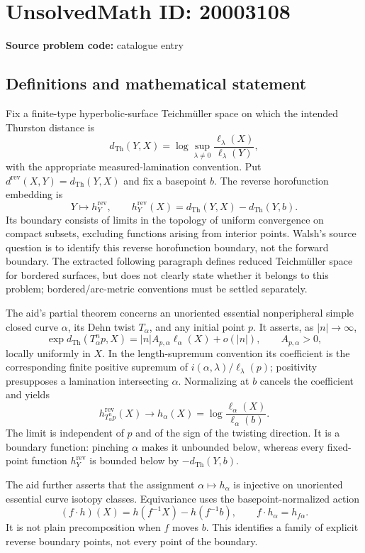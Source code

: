 \documentclass[11pt]{article}
\begin{document}
\section*{UnsolvedMath ID: 20003108}
\textbf{Source problem code:} catalogue entry
\subsection{Definitions and mathematical statement}
Fix a finite-type hyperbolic-surface Teichm\"uller space on which the intended Thurston distance is
\[
d_{\mathrm{Th}}(Y,X)=\log\sup_{\lambda\ne0}\frac{\ell_\lambda(X)}{\ell_\lambda(Y)},
\]
with the appropriate measured-lamination convention. Put $d^{\mathrm{rev}}(X,Y)=d_{\mathrm{Th}}(Y,X)$ and fix a basepoint $b$. The reverse horofunction embedding is
\[
Y\longmapsto h_Y^{\mathrm{rev}},\qquad
h_Y^{\mathrm{rev}}(X)=d_{\mathrm{Th}}(Y,X)-d_{\mathrm{Th}}(Y,b).
\]
Its boundary consists of limits in the topology of uniform convergence on compact subsets, excluding functions arising from interior points. Walsh's source question is to identify this reverse horofunction boundary, not the forward boundary. The extracted following paragraph defines reduced Teichm\"uller space for bordered surfaces, but does not clearly state whether it belongs to this problem; bordered/arc-metric conventions must be settled separately.

The aid's partial theorem concerns an unoriented essential nonperipheral simple closed curve $\alpha$, its Dehn twist $T_\alpha$, and any initial point $p$. It asserts, as $|n|\to\infty$,
\[
\exp d_{\mathrm{Th}}(T_\alpha^n p,X)
=|n|A_{p,\alpha}\ell_\alpha(X)+o(|n|),\qquad A_{p,\alpha}>0,
\]
locally uniformly in $X$. In the length-supremum convention its coefficient is the corresponding finite positive supremum of $i(\alpha,\lambda)/\ell_\lambda(p)$; positivity presupposes a lamination intersecting $\alpha$. Normalizing at $b$ cancels the coefficient and yields
\[
h_{T_\alpha^n p}^{\mathrm{rev}}(X)\longrightarrow
h_\alpha(X)=\log\frac{\ell_\alpha(X)}{\ell_\alpha(b)}.
\]
The limit is independent of $p$ and of the sign of the twisting direction. It is a boundary function: pinching $\alpha$ makes it unbounded below, whereas every fixed-point function $h_Y^{\mathrm{rev}}$ is bounded below by $-d_{\mathrm{Th}}(Y,b)$.

The aid further asserts that the assignment $\alpha\mapsto h_\alpha$ is injective on unoriented essential curve isotopy classes. Equivariance uses the basepoint-normalized action
\[
(f\cdot h)(X)=h(f^{-1}X)-h(f^{-1}b),\qquad f\cdot h_\alpha=h_{f\alpha}.
\]
It is not plain precomposition when $f$ moves $b$. This identifies a family of explicit reverse boundary points, not every point of the boundary.
\end{document}
